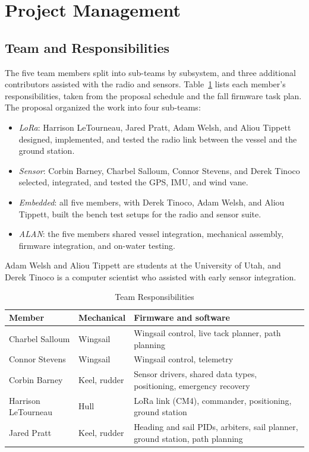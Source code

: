 \section{Project Management}
\label{sec:mgmt}

\subsection{Team and Responsibilities}
The five team members split into sub-teams by subsystem, and three additional
contributors assisted with the radio and sensors.
Table~\ref{tab:team} lists each member's responsibilities, taken from the
proposal schedule and the fall firmware task plan. The proposal organized the work into four sub-teams:
\begin{itemize}
\item \emph{LoRa}: Harrison LeTourneau, Jared Pratt, Adam Welsh, and Aliou
Tippett designed, implemented, and tested the radio link between the vessel
and the ground station.
\item \emph{Sensor}: Corbin Barney, Charbel Salloum, Connor Stevens, and
Derek Tinoco selected, integrated, and tested the GPS, IMU, and wind vane.
\item \emph{Embedded}: all five members, with Derek Tinoco, Adam Welsh, and
Aliou Tippett, built the bench test setups for the radio and sensor suite.
\item \emph{ALAN}: the five members shared vessel integration, mechanical
assembly, firmware integration, and on-water testing.
\end{itemize}
Adam Welsh and Aliou Tippett are students at the University of Utah, and
Derek Tinoco is a computer scientist who assisted with early sensor
integration.

\begin{table}[!htb]
\caption{Team Responsibilities}
\label{tab:team}
\centering
\footnotesize
\begin{tabular}{@{}p{}p{}p{}@{}}
\toprule
Member & Mechanical & Firmware and software \\
\midrule
Charbel Salloum & Wingsail & Wingsail control, live tack planner, path planning \\
Connor Stevens & Wingsail & Wingsail control, telemetry \\
Corbin Barney & Keel, rudder & Sensor drivers, shared data types, positioning, emergency recovery \\
Harrison LeTourneau & Hull & LoRa link (CM4), commander, positioning, ground station \\
Jared Pratt & Keel, rudder & Heading and sail PIDs, arbiters, sail planner, ground station, path planning \\
\bottomrule
\end{tabular}
\end{table}


